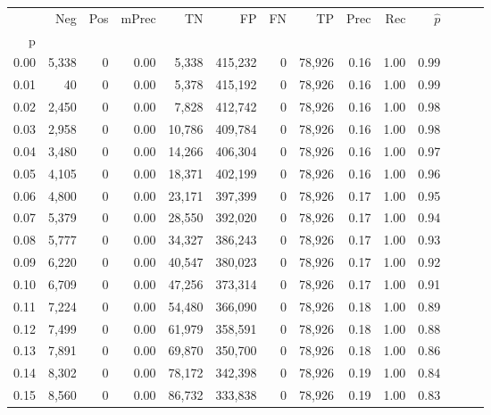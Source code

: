 \begin{tabular}{rrrrrrrrrrrrrr}
\toprule
{} &    Neg &    Pos & mPrec &       TN &       FP &      FN &      TP &  Prec &   Rec & $\hat{p}$ \\
p    &        &        &       &          &          &         &         &       &       &           \\
\midrule
0.00 &  5,338 &      0 &  0.00 &    5,338 &  415,232 &       0 &  78,926 &  0.16 &  1.00 &      0.99 \\
0.01 &     40 &      0 &  0.00 &    5,378 &  415,192 &       0 &  78,926 &  0.16 &  1.00 &      0.99 \\
0.02 &  2,450 &      0 &  0.00 &    7,828 &  412,742 &       0 &  78,926 &  0.16 &  1.00 &      0.98 \\
0.03 &  2,958 &      0 &  0.00 &   10,786 &  409,784 &       0 &  78,926 &  0.16 &  1.00 &      0.98 \\
0.04 &  3,480 &      0 &  0.00 &   14,266 &  406,304 &       0 &  78,926 &  0.16 &  1.00 &      0.97 \\
0.05 &  4,105 &      0 &  0.00 &   18,371 &  402,199 &       0 &  78,926 &  0.16 &  1.00 &      0.96 \\
0.06 &  4,800 &      0 &  0.00 &   23,171 &  397,399 &       0 &  78,926 &  0.17 &  1.00 &      0.95 \\
0.07 &  5,379 &      0 &  0.00 &   28,550 &  392,020 &       0 &  78,926 &  0.17 &  1.00 &      0.94 \\
0.08 &  5,777 &      0 &  0.00 &   34,327 &  386,243 &       0 &  78,926 &  0.17 &  1.00 &      0.93 \\
0.09 &  6,220 &      0 &  0.00 &   40,547 &  380,023 &       0 &  78,926 &  0.17 &  1.00 &      0.92 \\
0.10 &  6,709 &      0 &  0.00 &   47,256 &  373,314 &       0 &  78,926 &  0.17 &  1.00 &      0.91 \\
0.11 &  7,224 &      0 &  0.00 &   54,480 &  366,090 &       0 &  78,926 &  0.18 &  1.00 &      0.89 \\
0.12 &  7,499 &      0 &  0.00 &   61,979 &  358,591 &       0 &  78,926 &  0.18 &  1.00 &      0.88 \\
0.13 &  7,891 &      0 &  0.00 &   69,870 &  350,700 &       0 &  78,926 &  0.18 &  1.00 &      0.86 \\
0.14 &  8,302 &      0 &  0.00 &   78,172 &  342,398 &       0 &  78,926 &  0.19 &  1.00 &      0.84 \\
0.15 &  8,560 &      0 &  0.00 &   86,732 &  333,838 &       0 &  78,926 &  0.19 &  1.00 &      0.83 \\

\end{tabular}

